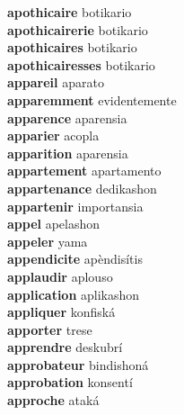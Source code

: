 \textbf{apothicaire } botikario \\
\textbf{apothicairerie } botikario \\
\textbf{apothicaires } botikario \\
\textbf{apothicairesses } botikario \\
\textbf{appareil } aparato \\
\textbf{apparemment } evidentemente \\
\textbf{apparence } aparensia \\
\textbf{apparier } acopla \\
\textbf{apparition } aparensia \\
\textbf{appartement } apartamento \\
\textbf{appartenance } dedikashon \\
\textbf{appartenir } importansia \\
\textbf{appel } apelashon \\
\textbf{appeler } yama \\
\textbf{appendicite } apèndisítis \\
\textbf{applaudir } aplouso \\
\textbf{application } aplikashon \\
\textbf{appliquer } konfiská \\
\textbf{apporter } trese \\
\textbf{apprendre } deskubrí \\
\textbf{approbateur } bindishoná \\
\textbf{approbation } konsentí \\
\textbf{approche } ataká \\
